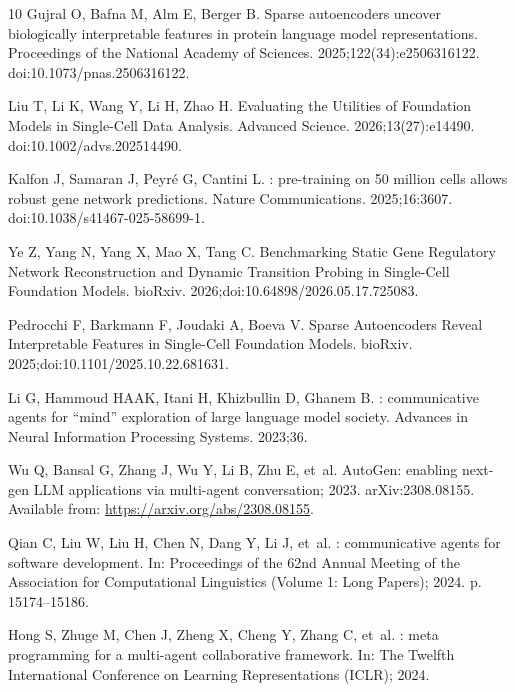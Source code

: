 \documentclass[10pt,letterpaper]{article}
\begin{document}
\begin{thebibliography}{10}
Gujral O, Bafna M, Alm E, Berger B.
\newblock Sparse autoencoders uncover biologically interpretable features in
  protein language model representations.
\newblock Proceedings of the National Academy of Sciences.
  2025;122(34):e2506316122.
\newblock doi:{10.1073/pnas.2506316122}.

Liu T, Li K, Wang Y, Li H, Zhao H.
\newblock Evaluating the Utilities of Foundation Models in Single-Cell Data
  Analysis.
\newblock Advanced Science. 2026;13(27):e14490.
\newblock doi:{10.1002/advs.202514490}.

Kalfon J, Samaran J, Peyr{\'e} G, Cantini L.
: pre-training on 50 million cells allows robust gene
  network predictions.
\newblock Nature Communications. 2025;16:3607.
\newblock doi:{10.1038/s41467-025-58699-1}.

Ye Z, Yang N, Yang X, Mao X, Tang C.
\newblock Benchmarking Static Gene Regulatory Network Reconstruction and
  Dynamic Transition Probing in Single-Cell Foundation Models.
\newblock bioRxiv. 2026;doi:{10.64898/2026.05.17.725083}.

Pedrocchi F, Barkmann F, Joudaki A, Boeva V.
\newblock Sparse Autoencoders Reveal Interpretable Features in Single-Cell
  Foundation Models.
\newblock bioRxiv. 2025;doi:{10.1101/2025.10.22.681631}.

Li G, Hammoud HAAK, Itani H, Khizbullin D, Ghanem B.
: communicative agents for ``mind'' exploration of large
  language model society.
\newblock Advances in Neural Information Processing Systems. 2023;36.

Wu Q, Bansal G, Zhang J, Wu Y, Li B, Zhu E, et~al. {AutoGen}: enabling
  next-gen {LLM} applications via multi-agent conversation; 2023.
\newblock arXiv:2308.08155.
\newblock Available from: \url{https://arxiv.org/abs/2308.08155}.

Qian C, Liu W, Liu H, Chen N, Dang Y, Li J, et~al.
: communicative agents for software development.
\newblock In: Proceedings of the 62nd Annual Meeting of the Association for
  Computational Linguistics (Volume 1: Long Papers); 2024. p. 15174--15186.

Hong S, Zhuge M, Chen J, Zheng X, Cheng Y, Zhang C, et~al.
: meta programming for a multi-agent collaborative
  framework.
\newblock In: The Twelfth International Conference on Learning Representations
  (ICLR); 2024.


\end{thebibliography}
\end{document}
